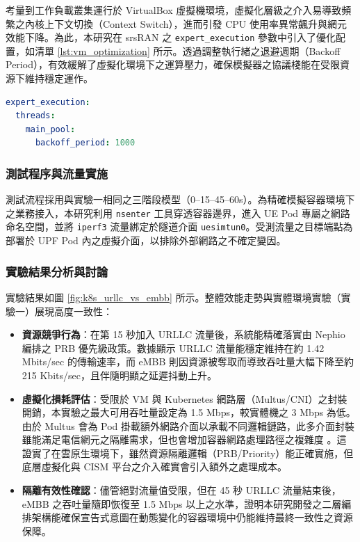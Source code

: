 考量到工作負載叢集運行於 VirtualBox 虛擬機環境，虛擬化層級之介入易導致頻繁之內核上下文切換（Context Switch），進而引發 CPU 使用率異常飆升與網元效能下降。為此，本研究在 srsRAN 之 \texttt{expert\_execution} 參數中引入了優化配置，如清單 \ref{lst:vm_optimization} 所示。透過調整執行緒之退避週期（Backoff Period），有效緩解了虛擬化環境下之運算壓力，確保模擬器之協議棧能在受限資源下維持穩定運作。

\begin{lstlisting}[language=yaml, caption={針對虛擬化環境之 srsRAN 執行緒優化配置}, label={lst:vm_optimization}]
expert_execution:
  threads:
    main_pool:
      backoff_period: 1000
\end{lstlisting}

\subsubsection{測試程序與流量實施}
測試流程採用與實驗一相同之三階段模型（0--15--45--60s）。為精確模擬容器環境下之業務接入，本研究利用 \texttt{nsenter} 工具穿透容器邊界，進入 UE Pod 專屬之網路命名空間，並將 \texttt{iperf3} 流量綁定於隧道介面 \texttt{uesimtun0}。受測流量之目標端點為部署於 UPF Pod 內之虛擬介面，以排除外部網路之不確定變因。

\subsubsection{實驗結果分析與討論}
實驗結果如圖 \ref{fig:k8s_urllc_vs_embb} 所示。整體效能走勢與實體環境實驗（實驗一）展現高度一致性：
\begin{itemize}
    \item \textbf{資源競爭行為}：在第 15 秒加入 URLLC 流量後，系統能精確落實由 Nephio 編排之 PRB 優先級政策。數據顯示 URLLC 流量能穩定維持在約 1.42 Mbits/sec 的傳輸速率，而 eMBB 則因資源被奪取而導致吞吐量大幅下降至約 215 Kbits/sec，且伴隨明顯之延遲抖動上升。
    \item \textbf{虛擬化損耗評估}：受限於 VM 與 Kubernetes 網路層（Multus/CNI）之封裝開銷，本實驗之最大可用吞吐量設定為 1.5 Mbps，較實體機之 3 Mbps 為低。由於 Multus 會為 Pod 掛載額外網路介面以承載不同邏輯鏈路，此多介面封裝雖能滿足電信網元之隔離需求，但也會增加容器網路處理路徑之複雜度 \cite{multus_cni}。這證實了在雲原生環境下，雖然資源隔離邏輯（PRB/Priority）能正確實施，但底層虛擬化與 CISM 平台之介入確實會引入額外之處理成本。
    \item \textbf{隔離有效性確認}：儘管絕對流量值受限，但在 45 秒 URLLC 流量結束後，eMBB 之吞吐量隨即恢復至 1.5 Mbps 以上之水準，證明本研究開發之二層編排架構能確保宣告式意圖在動態變化的容器環境中仍能維持最終一致性之資源保障。
\end{itemize}

